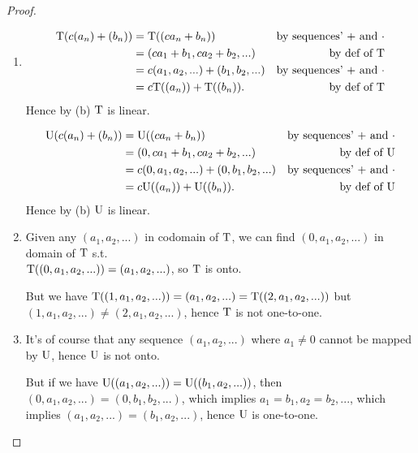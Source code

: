 \begin{proof} \ 
\begin{enumerate}
\item
\begin{align*}
    \mathrm{T}(c(a_n) + (b_n)) & = \mathrm{T}((c a_n + b_n)) & \text{by sequences' \(+\) and \(\cdot\)} \\
                       & = (c a_1 + b_1, c a_2 + b_2, ...) & \text{by def of \(\mathrm{T}\)} \\
                       & = c(a_1, a_2, ...) + (b_1, b_2, ...) & \text{by sequences' \(+\) and \(\cdot\)} \\
                       & = c\mathrm{T}((a_n)) + \mathrm{T}((b_n)). & \text{by def of \(\mathrm{T}\)}
\end{align*}
Hence by (b) \(\mathrm{T}\) is linear.

\begin{align*}
    \mathrm{U}(c(a_n) + (b_n)) & = \mathrm{U}((c a_n + b_n)) & \text{by sequences' \(+\) and \(\cdot\)} \\
                       & = (0, c a_1 + b_1, c a_2 + b_2, ...) & \text{by def of \(\mathrm{U}\)} \\
                       & = c(0, a_1, a_2, ...) + (0, b_1, b_2, ...) & \text{by sequences' \(+\) and \(\cdot\)} \\
                       & = c\mathrm{U}((a_n)) + \mathrm{U}((b_n)). & \text{by def of \(\mathrm{U}\)}
\end{align*}
Hence by (b) \(\mathrm{U}\) is linear.

\item
Given any \((a_1, a_2, ...)\) in codomain of \(\mathrm{T}\), we can find \((0, a_1, a_2, ...)\) in domain of \(\mathrm{T}\) s.t. \\ 
\(\mathrm{T}((0, a_1, a_2, ...)) = (a_1, a_2, ...)\), so \(\mathrm{T}\) is onto.

But we have \(\mathrm{T}((1, a_1, a_2, ...)) = (a_1, a_2, ...) = \mathrm{T}((2, a_1, a_2, ...))\) but \\
\((1, a_1, a_2, ...) \ne (2, a_1, a_2, ...)\), hence \(\mathrm{T}\) is not one-to-one.

\item
It's of course that any sequence \((a_1, a_2, ...)\) where \(a_1 \ne 0\) cannot be mapped by \(\mathrm{U}\), hence \(\mathrm{U}\) is not onto.

But if we have \(\mathrm{U}((a_1, a_2, ...)) = \mathrm{U}((b_1, a_2, ...))\), then \((0, a_1, a_2, ...) = (0, b_1, b_2, ...)\), which implies \(a_1 = b_1, a_2 = b_2, ...\), which implies \((a_1, a_2, ...) = (b_1, a_2, ...)\), hence \(\mathrm{U}\) is one-to-one.
\end{enumerate}
\end{proof}


